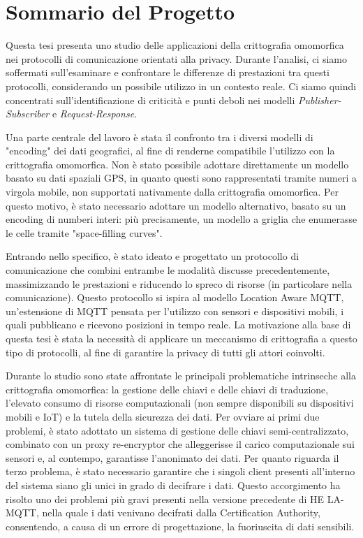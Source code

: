 \documentclass[12pt,a4paper,twoside]{book}
\begin{document}
\chapter{Sommario del Progetto}

Questa tesi presenta uno studio delle applicazioni della crittografia omomorfica nei protocolli di comunicazione orientati alla privacy. Durante l'analisi, ci siamo soffermati sull'esaminare e confrontare le differenze di prestazioni tra questi protocolli, considerando un possibile utilizzo in un contesto reale. Ci siamo quindi concentrati sull'identificazione di criticità e punti deboli nei modelli \textit{Publisher-Subscriber} e \textit{Request-Response}.

Una parte centrale del lavoro è stata il confronto tra i diversi modelli di "encoding" dei dati geografici, al fine di renderne compatibile l'utilizzo con la crittografia omomorfica. Non è stato possibile adottare direttamente un modello basato su dati spaziali GPS, in quanto questi sono rappresentati tramite numeri a virgola mobile, non supportati nativamente dalla crittografia omomorfica. Per questo motivo, è stato necessario adottare un modello alternativo, basato su un encoding di numberi interi: più precisamente, un modello a griglia che enumerasse le celle tramite "space-filling curves".

Entrando nello specifico, è stato ideato e progettato un protocollo di comunicazione che combini entrambe le modalità discusse precedentemente, massimizzando le prestazioni e riducendo lo spreco di risorse (in particolare nella comunicazione). Questo protocollo si ispira al modello Location Aware MQTT, un'estensione di MQTT pensata per l'utilizzo con sensori e dispositivi mobili, i quali pubblicano e ricevono posizioni in tempo reale. La motivazione alla base di questa tesi è stata la necessità di applicare un meccanismo di crittografia a questo tipo di protocolli, al fine di garantire la privacy di tutti gli attori coinvolti.

Durante lo studio sono state affrontate le principali problematiche intrinseche alla crittografia omomorfica: la gestione delle chiavi e delle chiavi di traduzione, l'elevato consumo di risorse computazionali (non sempre disponibili su dispositivi mobili e IoT) e la tutela della sicurezza dei dati. Per ovviare ai primi due problemi, è stato adottato un sistema di gestione delle chiavi semi-centralizzato, combinato con un proxy re-encryptor che alleggerisse il carico computazionale sui sensori e, al contempo, garantisse l'anonimato dei dati. Per quanto riguarda il terzo problema, è stato necessario garantire che i singoli client presenti all'interno del sistema siano gli unici in grado di decifrare i dati. Questo accorgimento ha risolto uno dei problemi più gravi presenti nella versione precedente di HE LA-MQTT, nella quale i dati venivano decifrati dalla Certification Authority, consentendo, a causa di un errore di progettazione, la fuoriuscita di dati sensibili.
\end{document}
